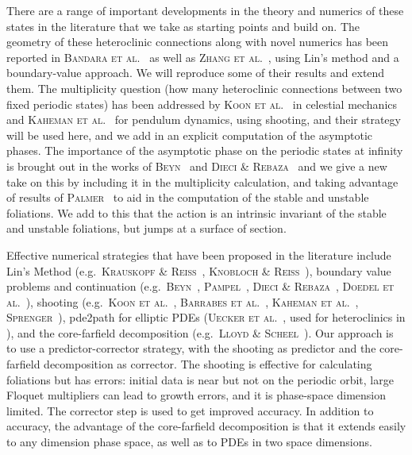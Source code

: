 \documentclass[10pt]{article}
\begin{document}
There are a range of important developments in the theory and numerics of these
states in the literature that we take as starting points and build on. The
geometry of these heteroclinic connections along with novel numerics has been
reported in \textsc{Bandara et al.}~\cite{bgbk21,bgbk23,bgbk25} as well as
\textsc{Zhang et al.}~\cite{zkk12}, using Lin's method and a boundary-value
approach.  We will reproduce some of their results and extend them. The
multiplicity question (how many heteroclinic connections between two fixed
periodic states) has been addressed by \textsc{Koon et al.}~\cite{klmr00} in
celestial mechanics and \textsc{Kaheman et al.}~\cite{Kaheman2023} for pendulum
dynamics, using shooting, and their strategy will be used here, and we add in an
explicit computation of the asymptotic phases. The importance of the asymptotic
phase on the periodic states at infinity is brought out in the works of
\textsc{Beyn}~\cite{beyn94} and \textsc{Dieci \& Rebaza}~\cite{dr04} and we give
a new take on this by including it in the multiplicity calculation, and taking
advantage of results of \textsc{Palmer}~\cite{p00} to aid in the computation of
the stable and unstable foliations.  We add to this that the action is an
intrinsic invariant of the stable and unstable foliations, but jumps at a
surface of section.

Effective numerical strategies that have been proposed in the literature include
Lin's Method (e.g.\ \textsc{Krauskopf \& Reiss}~\cite{kr09}, \textsc{Knobloch \&
Reiss}~\cite{kr09}), boundary value problems and continuation (e.g.\
\textsc{Beyn}~\cite{beyn94}, \textsc{Pampel}~\cite{p01,p09}, \textsc{Dieci \&
Rebaza}~\cite{dr04}, \textsc{Doedel et al.}~\cite{dkvk09}), shooting (e.g.\
\textsc{Koon et al.}~\cite{klmr00}, \textsc{Barrabes et al.}~\cite{bmo13},
\textsc{Kaheman et al.}~\cite{Kaheman2023}, \textsc{Sprenger}~\cite{sbs23}), pde2path for elliptic PDEs (\textsc{Uecker et al.}~\cite{uwr14}, used for heteroclinics in \cite{kuw19}), and
the core-farfield decomposition (e.g.\ \textsc{Lloyd \& Scheel}~\cite{Lloyd2017}).
Our approach is to use a predictor-corrector strategy, with the shooting as
predictor and the core-farfield decomposition as corrector. The shooting is
effective for calculating foliations but has errors: initial data is near but
not on the periodic orbit, large Floquet multipliers can lead to growth
errors, and it is phase-space dimension limited. The corrector step is used to get improved accuracy. In addition to
accuracy, the advantage of the core-farfield decomposition is that it extends easily to
any dimension phase space, as well as to PDEs in two space dimensions.
\end{document}
